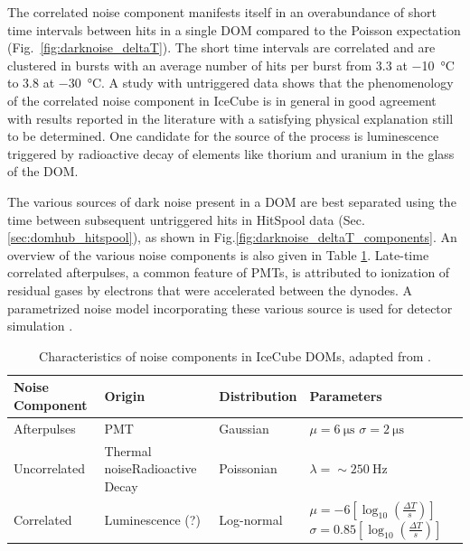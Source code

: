 The correlated noise component manifests itself in an overabundance of
short time intervals between hits in a single DOM compared to the
Poisson expectation (Fig.~\ref{fig:darknoise_deltaT}). The short time
intervals are correlated and are clustered in bursts with an average number of
hits per burst from \num{3.3} at \SI{-10}{\celsius} to \num{3.8} at
\SI{-30}{\celsius}. A study with untriggered data shows that the
phenomenology of the correlated noise component in IceCube is in general in
good agreement with results reported in the literature with a satisfying
physical explanation still to be determined.  One candidate for the source
of the process is luminescence triggered by radioactive decay of
elements like thorium and uranium in the glass of the DOM.

The various sources of dark noise present in a DOM are best separated using
the time between subsequent untriggered hits in HitSpool data (Sec.~
\ref{sec:domhub_hitspool}), as shown in
Fig.\ref{fig:darknoise_deltaT_components}. An overview of the various 
noise components is also given in Table \ref{tab:noise}.  Late-time
correlated afterpulses, a common feature of PMTs, is attributed to
ionization of residual gases by electrons that were accelerated between
the dynodes.  A parametrized noise model incorporating these various source
is used for detector simulation \cite{larson2013simulation}. 

\begin{table}[h!]
\caption{Characteristics of noise components in IceCube DOMs, adapted from \cite{stanisha_noise_14}.}
  \centering
  \footnotesize
\begin{tabularx}{\textwidth}{lXXX}
\toprule
Noise Component& Origin & Distribution & Parameters \\
\midrule
Afterpulses & PMT & Gaussian & $\mu = \SI{6}{\micro\second}$ \newline $\sigma = \SI{2}{\micro\second}$\\
Uncorrelated & Thermal noise\newline Radioactive Decay & Poissonian & $\lambda = \sim \SI{250}{\hertz}$\\
Correlated & Luminescence (?) & Log-normal & $\mu = \num{-6} [\log_{10}(\frac{\Delta T}{s})]$ \newline $\sigma = \num{0.85} [\log_{10}(\frac{\Delta T}{s})]$\\
\bottomrule
\end{tabularx}
\label{tab:noise}
\end{table}

